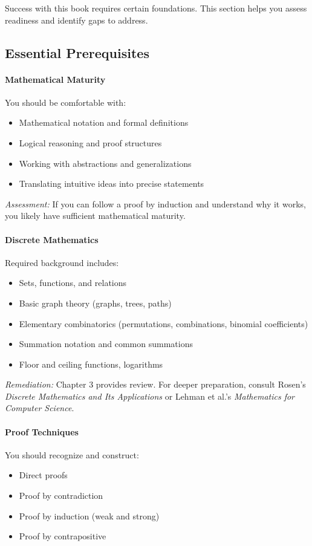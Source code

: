 Success with this book requires certain foundations. This section helps you assess readiness and identify gaps to address.

\subsection{Essential Prerequisites}

\paragraph{Mathematical Maturity}
You should be comfortable with:
\begin{itemize}
    \item Mathematical notation and formal definitions
    \item Logical reasoning and proof structures
    \item Working with abstractions and generalizations
    \item Translating intuitive ideas into precise statements
\end{itemize}

\textit{Assessment:} If you can follow a proof by induction and understand why it works, you likely have sufficient mathematical maturity.

\paragraph{Discrete Mathematics}
Required background includes:
\begin{itemize}
    \item Sets, functions, and relations
    \item Basic graph theory (graphs, trees, paths)
    \item Elementary combinatorics (permutations, combinations, binomial coefficients)
    \item Summation notation and common summations
    \item Floor and ceiling functions, logarithms
\end{itemize}

\textit{Remediation:} Chapter 3 provides review. For deeper preparation, consult Rosen's \textit{Discrete Mathematics and Its Applications} or Lehman et al.'s \textit{Mathematics for Computer Science}.

\paragraph{Proof Techniques}
You should recognize and construct:
\begin{itemize}
    \item Direct proofs
    \item Proof by contradiction
    \item Proof by induction (weak and strong)
    \item Proof by contrapositive
\end{itemize}

